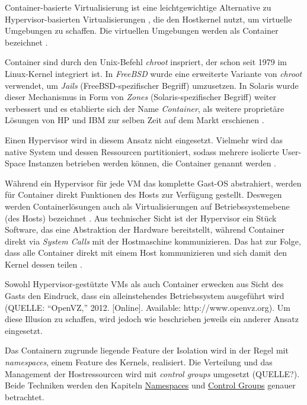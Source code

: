 \documentclass[../main.tex]{subfiles}
\begin{document}
      Container-basierte Virtualisierung ist eine leichtgewichtige Alternative zu Hypervisor-basierten Virtualisierungen \cite[S.2]{containerVirtPerformance}, die den Hostkernel nutzt, um virtuelle Umgebungen zu schaffen. Die virtuellen Umgebungen werden als Container bezeichnet \cite[S.1]{dockerSec1}.

      Container sind durch den Unix-Befehl \emph{chroot} inspriert, der schon seit 1979 im Linux-Kernel integriert ist. In \emph{FreeBSD} wurde eine erweiterte Variante von \emph{chroot} verwendet, um \emph{Jails} (FreeBSD-spezifischer Begriff) umzusetzen. In Solaris wurde dieser Mechanismus in Form von \emph{Zones} (Solaris-spezifischer Begriff) weiter verbessert und es etablierte sich der Name \emph{Container}, als weitere proprietäre Lösungen von HP und IBM zur selben Zeit auf dem Markt erschienen \cite[S.2]{dockerLXCKub}.

      Einen Hypervisor wird in diesem Ansatz nicht eingesetzt. Vielmehr wird das native System und dessen Ressourcen partitioniert, sodass mehrere isolierte User-Space Instanzen betrieben werden können, die Container genannt werden \cite[S.2]{containerVirtPerformance} .

      Während ein Hypervisor für jede VM das komplette Gast-OS abstrahiert, werden für Container direkt Funktionen des Hosts zur Verfügung gestellt. Deswegen werden Containerlösungen auch als Virtualisierungen auf Betriebssystemebene (des Hosts) bezeichnet \cite[S.6]{dockerBook}\cite[S.2]{containerVirtPerformance}. Aus technischer Sicht ist der Hypervisor ein Stück Software, das eine Abstraktion der Hardware bereitstellt, während Container direkt via \emph{System Calls} mit der Hostmaschine kommunizieren. Das hat zur Folge, dass alle Container direkt mit einem Host kommunizieren und sich damit den Kernel dessen teilen \cite[S.2]{containerVirtPerformance}\cite[S.3]{dockerLXCKub}.

      Sowohl Hypervisor-gestützte VMs als auch Container erwecken aus Sicht des Gasts den Eindruck, dass ein alleinstehendes Betriebssystem ausgeführt wird (QUELLE: “OpenVZ,” 2012. [Online]. Available: http://www.openvz.org). Um diese Illusion zu schaffen, wird jedoch wie beschrieben jeweils ein anderer Ansatz eingesetzt.

      Das Containern zugrunde liegende Feature der Isolation wird in der Regel mit \emph{namespaces}, einem Feature des Kernels, realisiert. Die Verteilung und das Management der Hostressourcen wird mit \emph{control groups} umgesetzt (QUELLE?). Beide Techniken werden den Kapiteln \hyperref[secIsolierung]{\glqq{}Namespaces\grqq{}} und \hyperref[secResLimit]{\glqq{}Control Groups\grqq{}} genauer betrachtet.
\end{document}

